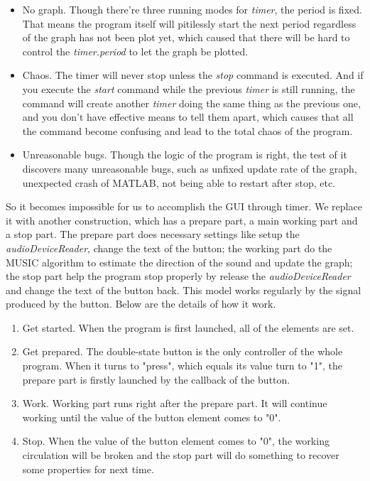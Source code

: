 \documentclass[UTF8]{article}
\begin{document}
\begin{itemize}
\item
  No graph. Though there're three running modes for \emph{timer}, the
  period is fixed. That means the program itself will pitilessly start
  the next period regardless of the graph has not been plot yet, which
  caused that there will be hard to control the \emph{timer.period} to
  let the graph be plotted.
\item
  Chaos. The timer will never stop unless the \emph{stop} command is
  executed. And if you execute the \emph{start} command while the
  previous \emph{timer} is still running, the command will create
  another \emph{timer} doing the same thing as the previous one, and
  you don't have effective means to tell them apart, which causes that
  all the command become confusing and lead to the total chaos of the
  program.
\item
  Unreasonable bugs. Though the logic of the program is right, the test
  of it discovers many unreasonable bugs, such as unfixed update rate of
  the graph, unexpected crash of MATLAB, not being able to restart after
  stop, etc.
\end{itemize}

So it becomes impossible for us to accomplish the GUI through timer. We
replace it with another construction, which has a prepare part, a main
working part and a stop part. The prepare part does necessary settings
like setup the \emph{audioDeviceReader}, change the text of the
button; the working part do the MUSIC algorithm to estimate the
direction of the sound and update the graph; the stop part help the
program stop properly by release the \emph{audioDeviceReader} and
change the text of the button back. This model works regularly by the
signal produced by the button. Below are the details of how it work.

\begin{enumerate}
\item
  Get started. When the program is first launched, all of the elements
  are set.
\item
  Get prepared. The double-state button is the only controller of the
  whole program. When it turns to "press", which equals its value turn
  to "1", the prepare part is firstly launched by the callback of the
  button.
\item
  Work. Working part runs right after the prepare part. It will continue
  working until the value of the button element comes to "0".
\item
  Stop. When the value of the button element comes to "0", the working
  circulation will be broken and the stop part will do something to
  recover some properties for next time.
\end{enumerate}
\end{document}
